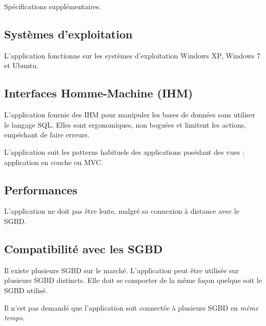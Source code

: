 Spécifications supplémentaires.

\subsection{Systèmes d'exploitation}
L'application fonctionne sur les systèmes d'exploitation Windows XP, Windows 7 et Ubuntu.

\subsection{Interfaces Homme-Machine (IHM)}
L'application fournie des IHM pour manipuler les bases de données sans utiliser le langage SQL.
Elles sont ergonomiques, non boguées et limitent les actions, empéchant de faire  erreurs.

L'application suit les patterns habituels des applications posédant des vues :
application en couche ou MVC.

\subsection{Performances}
L'application ne doit pas être lente, malgré sa connexion à distance avec le SGBD.

\subsection{Compatibilité avec les SGBD}
Il existe plusieurs SGBD sur le marché.
L'application peut être utilisée sur plusieurs SGBD distincts.
Elle doit se comporter de la même façon quelque soit le SGBD utilisé.

Il n'est pas demandé que l'application soit connectée à plusieurs SGBD en \textit{même temps}.
